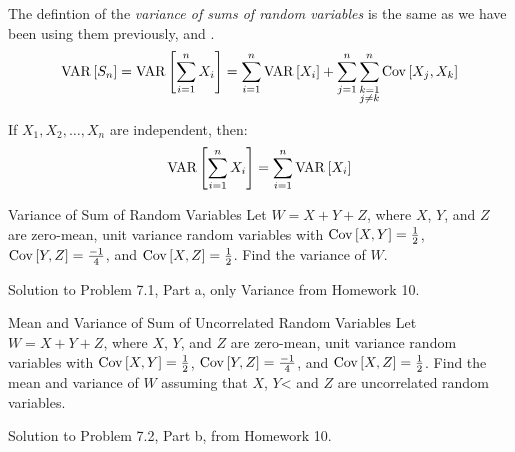 		\begin{definition} \label{def:Variance of Sums of Random Variables}
			The defintion of the \emph{variance of sums of random variables} is the same as we have been using them previously,  and .
			\begin{equation} \label{eq:Variance of Sums of Random Variables}
				\operatorname{\operatorname{VAR}} \left[ S_{n} \right] = \operatorname{\operatorname{VAR}} \left[ \sum_{i=1}^{n} X_{i} \right] = \sum_{i=1}^{n} \operatorname{\operatorname{VAR}} \left[ X_{i} \right] + \sum_{j=1}^{n} \sum_{\substack{k=1 \\ j \neq k}}^{n} \operatorname{\operatorname{Cov}} \left[ X_{j}, X_{k} \right]
			\end{equation}
			\begin{remark} \label{rmk:Variance of Sums of Independent Random Variables}
				If $X_{1}, X_{2}, \ldots , X_{n}$ are independent, then:
				\begin{equation} \label{eq:Variance of Sums of Independent Random Variables}
					\operatorname{\operatorname{VAR}} \left[ \sum_{i=1}^{n} X_{i} \right] = \sum_{i=1}^{n} \operatorname{\operatorname{VAR}} \left[ X_{i} \right]
				\end{equation}
			\end{remark}
		\end{definition}
		\begin{example}[Problem 7.1]{Variance of Sum of Random Variables}
                  Let $W = X + Y + Z$, where $X$, $Y$, and $Z$ are zero-mean, unit variance random variables with $\operatorname{\operatorname{Cov}} \left[ X,Y \right] = \frac{1}{2}$, $\operatorname{\operatorname{Cov}} \left[ Y,Z \right] = \frac{-1}{4}$, and $\operatorname{\operatorname{Cov}} \left[ X,Z \right] = \frac{1}{2}$.
                  Find the variance of $W$.

                  \tcblower

                  Solution to Problem 7.1, Part a, only Variance from Homework 10.
		\end{example}
		\begin{example}[Problem 7.1]{Mean and Variance of Sum of Uncorrelated Random Variables}
                  Let $W = X + Y + Z$, where $X$, $Y$, and $Z$ are zero-mean, unit variance random variables with $\operatorname{\operatorname{Cov}} \left[ X,Y \right] = \frac{1}{2}$, $\operatorname{\operatorname{Cov}} \left[ Y,Z \right] = \frac{-1}{4}$, and $\operatorname{\operatorname{Cov}} \left[ X,Z \right] = \frac{1}{2}$.
                  Find the mean and variance of $W$ assuming that $X$, $Y$< and $Z$ are uncorrelated random variables.

                  \tcblower

                  Solution to Problem 7.2, Part b, from Homework 10.
		\end{example}
